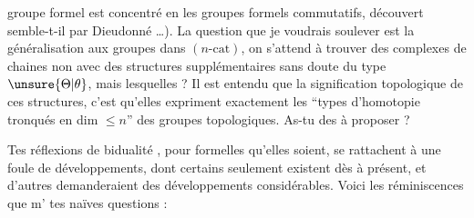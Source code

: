 groupe formel est concentré en les groupes formels commutatifs, découvert semble-t-il par Dieudonné \dots). La question que je voudrais soulever est la généralisation aux groupes dans $(n\text{-cat})$, on s'attend à trouver des complexes de chaines non 
avec des structures supplémentaires sans doute du type $\unsure{\Theta|\theta}$, mais lesquelles ? Il est entendu que la signification topologique de ces structures, c'est qu'elles expriment exactement les ``types d'homotopie tronqués en dim $\leq n$'' des groupes topologiques.  As-tu des  à proposer ?


 Tes réflexions de bidualité , pour formelles qu'elles soient, se rattachent à une foule de développements, dont certains seulement existent\unsure{,} dès à présent, et d'autres demanderaient des développements considérables. Voici les réminiscences que m' tes naïves questions :
